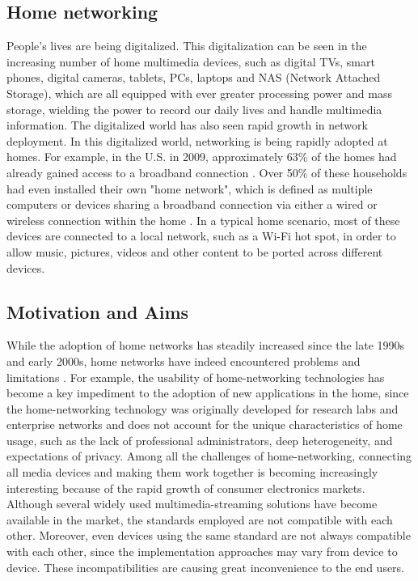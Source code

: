 
\subsection{Home networking}
People's lives are being digitalized. This digitalization can be seen in the
increasing number of home multimedia devices, such as digital TVs, smart
phones, digital cameras, tablets, PCs, laptops and NAS (Network Attached
Storage), which are all equipped with ever greater processing power and mass
storage, wielding the power to record our daily lives and handle multimedia
information. The digitalized world has also seen rapid growth in network
deployment.  In this digitalized world, networking is being rapidly adopted at
homes. For example, in the U.S. in 2009, approximately 63\% of the homes had
already gained access to a broadband connection \cite{stateofHN}. Over 50\% of
these households had even installed their own "home network", which is defined as
multiple computers or devices sharing a broadband connection via either a wired
or wireless connection within the home \cite{standards-perspective}. In a typical home
scenario, most of these devices are connected to a local network, such as a
Wi-Fi hot spot, in order to allow music, pictures, videos and other content to
be ported across different devices.

\subsection{Motivation and Aims}
While the adoption of home networks has steadily increased since the late 1990s
and early 2000s, home networks have indeed encountered problems and limitations
\cite{stateofHN}. For example, the usability of home-networking technologies has
become a key impediment to the adoption of new applications in the home, since the
home-networking technology was originally developed for research labs and
enterprise networks and does not account for the unique characteristics of home
usage, such as the lack of professional administrators, deep heterogeneity, and
expectations of privacy. Among all the challenges of home-networking,
connecting all media devices and making them work together is becoming
increasingly interesting because of the rapid growth of consumer electronics
markets. Although several widely used multimedia-streaming solutions have
become available in the market, the standards employed are not compatible with
each other. Moreover, even devices using the same standard are not always
compatible with each other, since the implementation approaches may vary from
device to device. These incompatibilities are causing great inconvenience to
the end users.

